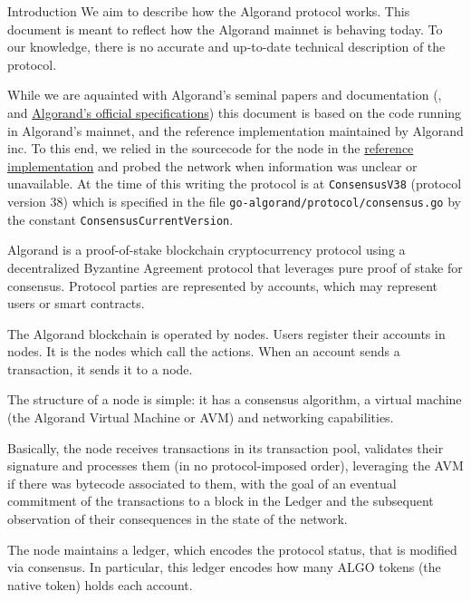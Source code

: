 \documentclass[10pt,a4paper]{article}
\begin{document}
\begin{section}{Introduction}
We aim to describe how the Algorand protocol works. 
This document is meant to reflect how the Algorand mainnet is behaving
today. 
To our knowledge, there is no accurate and up-to-date technical description 
of the protocol. 

While we are aquainted with Algorand's seminal papers and documentation 
(\cite{DBLP:conf/sosp/GiladHMVZ17}, \cite{DBLP:journals/corr/Micali16} and
\href{https://github.com/algorandfoundation/specs}{Algorand's official specifications})
this document is based on the code running in Algorand's mainnet, and the reference
implementation maintained by Algorand inc. To this end, we relied in the sourcecode
for the node in the \href{https://github.com/algorand/go-algorand/}{reference implementation}
and probed the network when information was unclear or unavailable.
At the time of this writing the protocol is at {\tt ConsensusV38} 
(protocol version 38)
which is specified in the file {\tt go-algorand/protocol/consensus.go} by the
constant {\tt ConsensusCurrentVersion}. 

Algorand is a proof-of-stake blockchain cryptocurrency protocol 
using a decentralized By\-zan\-tine Agreement protocol that leverages 
pure proof of stake for consensus. 
Protocol parties are represented by accounts, which may represent users
or smart contracts. 

The Algorand blockchain is operated by nodes. Users register their accounts 
in nodes. It is the nodes which call the actions. 
When an account sends a transaction, it sends it to a node. 

The structure of a node is simple: 
it has a consensus algorithm,
a virtual machine (the Algorand Virtual Machine or AVM) and networking
capabilities.

Basically, the node receives transactions in its transaction pool,
validates their signature and processes them (in no protocol-imposed order), leveraging the
AVM if there was bytecode associated to them, with the goal of an eventual commitment of the transactions
to a block in the Ledger and the subsequent observation of their consequences in the state of the network.

The node maintains a ledger, which encodes the protocol status,
that is modified via consensus.
In particular, this ledger encodes how many {\sf ALGO tokens} 
(the native token) holds each account.


\end{section}
\end{document}

